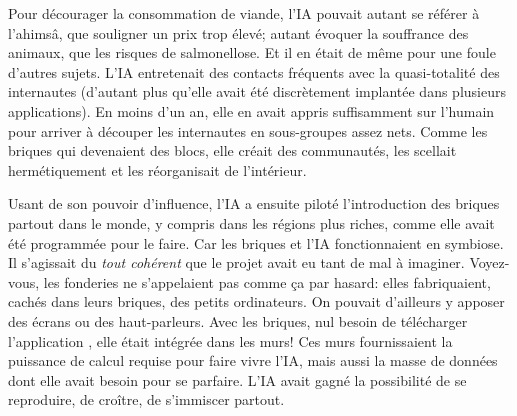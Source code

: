 Pour décourager la consommation de viande, l'IA pouvait autant se référer à
l'ahimsâ, que souligner un prix trop élevé; autant évoquer la souffrance des
animaux, que les risques de salmonellose.  Et il en était de même pour une
foule d'autres sujets. L'IA entrete\-nait des contacts fréquents avec la
quasi-totalité des internautes (d'autant plus qu'elle avait été
dis\-crè\-tement implantée dans plusieurs applications).  En moins d'un an,
elle en avait appris suffisam\-ment sur l'humain pour arriver à découper les
internautes en sous-groupes assez nets.  Comme les briques qui devenaient des
blocs, elle créait des com\-munautés, les scellait herméti\-que\-ment et les
réorganisait de l'intérieur.

Usant de son pouvoir d'influence, l'IA a ensuite piloté l'introduction
des briques partout dans le monde, y compris dans les régions plus riches,
comme elle avait été programmée pour le faire. Car
les briques et l'IA fonctionnaient en symbiose. Il s'agissait du \textit{tout
cohérent} que le projet \nomProjet{} avait eu tant de mal à imaginer.
Voyez-vous, les fonderies ne s'appelaient pas comme ça par hasard: elles
fabri\-quaient, cachés dans leurs briques, des petits ordinateurs.  On pouvait
d'ail\-leurs y apposer des écrans ou des haut-parleurs. Avec les briques, nul
besoin de télécharger l'application \nomProjet{}, elle était intégrée dans les
murs!  Ces murs fournissaient la puissance de calcul requise pour faire vivre
l'IA, mais aussi la masse de données dont elle avait besoin pour se parfaire.
L'IA avait gagné la possibilité de se reproduire, de croître, de s'immiscer
partout.




